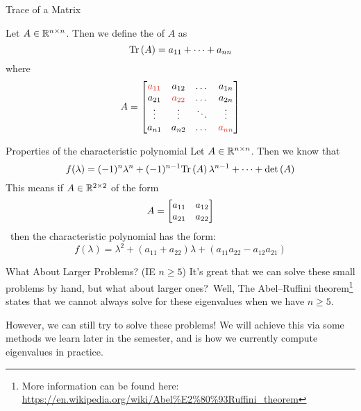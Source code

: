\documentclass[xcoler=dvipsnames, aspectratio=169]{beamer}
\begin{document}
    \begin{frame}{Trace of a Matrix}
        \begin{defn}
            Let $A\in\mathbb{R}^{n\times n}$. Then we define the  of $A$ as
            \[
                \mathrm{Tr}\left(A\right) = a_{11} + \dots + a_{nn}
            \]
            where
            \[
                A = \bMat{
                    \rText{a_{11}} & a_{12} & \dots & a_{1n}\\
                    a_{21} & \rText{a_{22}} & \dots & a_{2n}\\
                    \vdots & \vdots & \ddots& \vdots\\
                    a_{n1} & a_{n2} & \dots & \rText{a_{nn}}
                }
            \]
        \end{defn}
    \end{frame}
    \begin{frame}{Properties of the characteristic polynomial}
        Let $A\in\mathbb{R}^{n\times n}$. Then we know that 
        \[
            f(\lambda) = (-1)^n\lambda^n + (-1)^{n-1}\trace{A}\lambda^{n-1} + \dots + \det{A}
        \]\pause
        This means if $A\in\mathbb{R}^{2\times 2}$ of the form
        \[
            A = \begin{bmatrix}
                a_{11} & a_{12}\\
                a_{21} & a_{22}
            \end{bmatrix}
        \]\pause\ 
        then the characteristic polynomial has the form:\pause
        \[
            f(\lambda) = \lambda^2 + (a_{11}+a_{22})\lambda + (a_{11}a_{22} - a_{12}a_{21})
        \]

    \end{frame}
    \begin{frame}{What About Larger Problems? (IE $n\geq 5$)}
        It's great that we can solve these small problems by hand, but what about larger ones?\pause\
        Well, The Abel–Ruffini theorem\footnote{More information can be found here: 
        \url{https://en.wikipedia.org/wiki/Abel\%E2\%80\%93Ruffini_theorem}} 
        states that we cannot always solve for these eigenvalues when we have $n\geq 5$.\pause\

        However, we can still try to solve these problems! We will achieve this via some methods
        we learn later in the semester, and is how we currently compute eigenvalues in practice.
    \end{frame}
\end{document}
